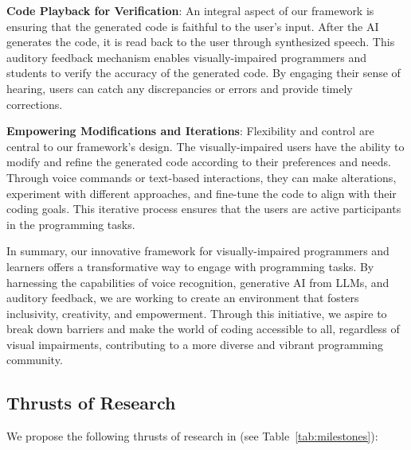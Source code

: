 {\bf Code Playback for Verification}: An integral aspect of our
framework is ensuring that the generated code is faithful to the
user's input. After the AI generates the code, it is read back to the
user through synthesized speech. This auditory feedback mechanism
enables visually-impaired programmers and students to verify the
accuracy of the generated code. By engaging their sense of hearing,
users can catch any discrepancies or errors and provide timely
corrections.

  
{\bf Empowering Modifications and Iterations}: Flexibility and control
are central to our framework's design. The visually-impaired users
have the ability to modify and refine the generated code according to
their preferences and needs. Through voice commands or text-based
interactions, they can make alterations, experiment with different
approaches, and fine-tune the code to align with their coding
goals. This iterative process ensures that the users are active
participants in the programming tasks.

In summary, our innovative framework for visually-impaired programmers
and learners offers a transformative way to engage with programming
tasks. By harnessing the capabilities of voice recognition, generative
AI from LLMs, and auditory feedback, we are working to create an
environment that fosters inclusivity, creativity, and
empowerment. Through this initiative, we aspire to break down barriers
and make the world of coding accessible to all, regardless of visual
impairments, contributing to a more diverse and vibrant programming
community.

\subsection{Thrusts of Research}

We propose the following thrusts of research in {\tool} (see Table~\ref{tab:milestones}):

\vspace{3pt}

